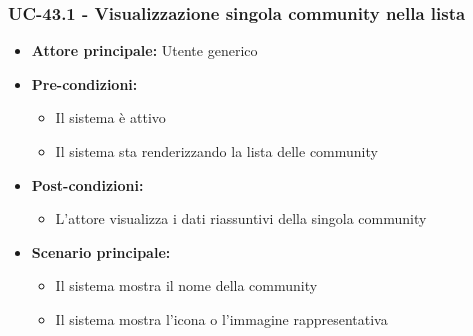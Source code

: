 \documentclass[a4paper,12pt]{article}
\begin{document}
\subsubsection{UC-43.1 - Visualizzazione singola community nella lista} \label{subsec:UC-43.1}
\begin{itemize}
    \item \textbf{Attore principale:} Utente generico
    \item \textbf{Pre-condizioni:} 
    \begin{itemize}
        \item Il sistema è attivo
        \item Il sistema sta renderizzando la lista delle community
    \end{itemize}
    \item \textbf{Post-condizioni:}
    \begin{itemize}
        \item L'attore visualizza i dati riassuntivi della singola community
    \end{itemize}
    \item \textbf{Scenario principale:} 
    \begin{itemize}
        \item Il sistema mostra il nome della community
        \item Il sistema mostra l'icona o l'immagine rappresentativa
    \end{itemize}
\end{itemize}
\end{document}
